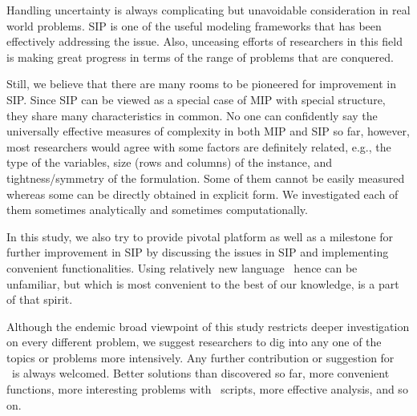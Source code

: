Handling uncertainty is always complicating but unavoidable consideration in real world problems. SIP is one of the useful modeling frameworks that has been effectively addressing the issue. Also, unceasing efforts of researchers in this field is making great progress in terms of the range of problems that are conquered. 

Still, we believe that there are many rooms to be pioneered for improvement in SIP. Since SIP can be viewed as a special case of MIP with special structure, they share many characteristics in common. No one can confidently say the universally effective measures of complexity in both MIP and SIP so far, however, most researchers would agree with some factors are definitely related, e.g., the type of the variables, size (rows and columns) of the instance, and tightness/symmetry of the formulation. Some of them cannot be easily measured whereas some can be directly obtained in explicit form. We investigated each of them sometimes analytically and sometimes computationally.

In this study, we also try to provide pivotal platform as well as a milestone for further improvement in SIP by discussing the issues in SIP and implementing convenient functionalities. Using relatively new language \julia\ hence can be unfamiliar, but which is most convenient to the best of our knowledge, is a part of that spirit. 

Although the endemic broad viewpoint of this study restricts deeper investigation on every different problem, we suggest researchers to dig into any one of the topics or problems more intensively. Any further contribution or suggestion for \siplibtwo\ is always welcomed. Better solutions than discovered so far, more convenient functions, more interesting problems with \julia\ scripts, more effective analysis, and so on.

